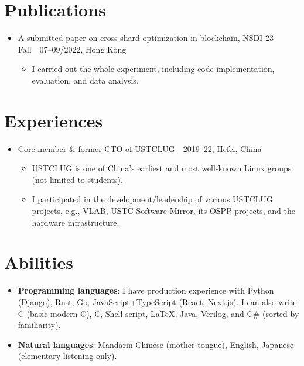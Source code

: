 \documentclass{article}
\newcommand{\Cpp}{C\nolinebreak[4]\hspace{-.05em}\raisebox{.4ex}{\tiny\bf ++}}
\newcommand{\Csharp}{C{\fontfaceLiberationSerif\#}}
\begin{document}
\section*{Publications}
\begin{itemize}[parsep=0.1cm,leftmargin=0.4cm]
  \item A submitted paper on cross-shard optimization in blockchain, NSDI {\textquotesingle}23 Fall\ \dotfill\ 07--09/2022, Hong Kong
  \begin{itemize}[itemsep=0cm,parsep=0cm,topsep=0cm,leftmargin=0.25cm,label=]
    \item I carried out the whole experiment, including code implementation, evaluation, and data analysis.
  \end{itemize}
\end{itemize}

\section*{Experiences}
\begin{itemize}[parsep=0.1cm,leftmargin=0.4cm]
  \item Core member \& former CTO of \href{https://lug.ustc.edu.cn/}{USTCLUG}\ \dotfill\ 2019--22, Hefei, China
    \begin{itemize}[itemsep=0cm,parsep=0cm,topsep=0cm,leftmargin=0.25cm,label=]
      \item USTCLUG is one of China's earliest and most well-known Linux groups (not limited to students).
      \item I participated in the development/leadership of various USTCLUG projects, e.g., \href{https://vlab.ustc.edu.cn/}{VLAB}, \href{https://mirrors.ustc.edu.cn/}{USTC Software Mirror}, its \href{https://summer-ospp.ac.cn/}{OSPP} projects, and the hardware infrastructure.
    \end{itemize}
\end{itemize}

\section*{Abilities}
\begin{itemize}[parsep=0.1cm,leftmargin=0.4cm]
  \item \textbf{Programming languages}:
    I have production experience with Python (Django), Rust, Go, JavaScript+TypeScript (React, Next.js).
    I can also write \Cpp{} (basic modern \Cpp), C, Shell script, \LaTeX, Java, Verilog, and \Csharp{} (sorted by familiarity).
  \item \textbf{Natural languages}: Mandarin Chinese (mother tongue), English, Japanese (elementary listening only).
\end{itemize}
\end{document}
